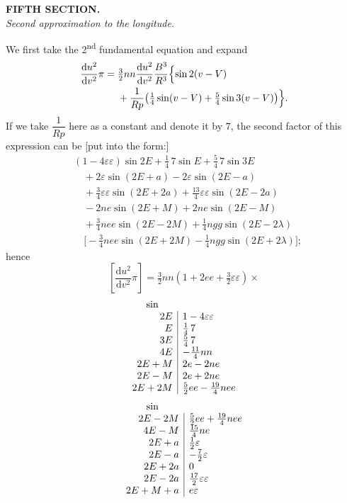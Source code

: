 \clearpage
\begingroup
{}
\renewcommand{\headrulewidth}{0pt}
\begin{center}
\textbf{FIFTH SECTION.}\\[8pt]
\textit{Second approximation to the longitude.}
\end{center}
\par\noindent\hspace*{\parindent}We first take the 2\textsuperscript{nd} fundamental equation and expand
\[
\begin{aligned}
\frac{\mathrm du^2}{\mathrm dv^2}\pi
={}&\tfrac32nn\frac{\mathrm du^2}{\mathrm dv^2}\frac{B^3}{R^3}
\Bigl\{\sin2(v-V)\\
&+\frac{1}{Rp}\bigl(\tfrac14\sin(v-V)+\tfrac54\sin3(v-V)\bigr)\Bigr\}.
\end{aligned}
\]
\noindent If we take \(\dfrac{1}{Rp}\) here as a constant and denote it by \(7\),
the second factor of this expression can be [put into the form:]
\[
\begin{aligned}
&(1-4\varepsilon\varepsilon)\sin2E+\tfrac14\,7\sin E+\tfrac54\,7\sin3E\\
&\quad+2\varepsilon\sin(2E+a)-2\varepsilon\sin(2E-a)\\
&\quad+\tfrac34\varepsilon\varepsilon\sin(2E+2a)+\tfrac{13}{4}\varepsilon\varepsilon\sin(2E-2a)\\
&\quad-2ne\sin(2E+M)+2ne\sin(2E-M)\\
&\quad+\tfrac34nee\sin(2E-2M)+\tfrac14ngg\sin(2E-2\lambda)\\
&\quad\bigl[-\tfrac34nee\sin(2E+2M)-\tfrac14ngg\sin(2E+2\lambda)\bigr];
\end{aligned}
\]
\noindent hence
\[
\left[\frac{\mathrm du^2}{\mathrm dv^2}\pi\right]
=\tfrac32nn(1+2ee+\tfrac32\varepsilon\varepsilon)\times
\]
\[
\begin{array}{r|l}
\multicolumn{1}{c}{\sin}&\\
2E&1-4\varepsilon\varepsilon\\
E&\tfrac14\,7\\
3E&\tfrac54\,7\\
4E&-\tfrac{11}{4}nn\\
2E+M&2e-2ne\\
2E-M&2e+2ne\\
2E+2M&\tfrac52ee-\tfrac{19}{4}nee
\end{array}
\]
\[
\begin{array}{r|l}
\multicolumn{1}{c}{\sin}&\\
2E-2M&\tfrac52ee+\tfrac{19}{4}nee\\
4E-M&\tfrac{15}{4}ne\\
2E+a&\tfrac12\varepsilon\\
2E-a&-\tfrac72\varepsilon\\
2E+2a&0\\
2E-2a&\tfrac{17}{2}\varepsilon\varepsilon\\
2E+M+a&e\varepsilon
\end{array}
\]
